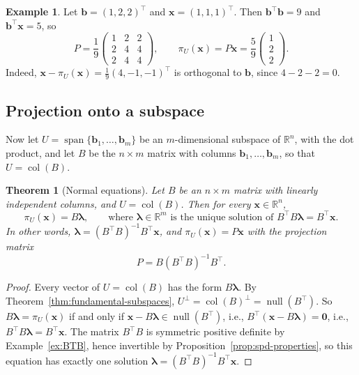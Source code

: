 \documentclass[11pt]{article}
\theoremstyle{definition}
\newtheorem{example}[definition]{Example}
\theoremstyle{plain}
\newtheorem{theorem}[definition]{Theorem}
\theoremstyle{remark}
\DeclareMathOperator{\Null}{null}
\DeclareMathOperator{\col}{col}
\DeclareMathOperator{\Span}{span}
\begin{document}
\begin{example}
    Let $\mathbf{b} = (1, 2, 2)^\top$ and $\mathbf{x} = (1, 1, 1)^\top$. Then $\mathbf{b}^\top \mathbf{b} = 9$ and $\mathbf{b}^\top \mathbf{x} = 5$, so
    \[P = \frac{1}{9} \begin{pmatrix} 1 & 2 & 2 \\ 2 & 4 & 4 \\ 2 & 4 & 4 \end{pmatrix}, \qquad \pi_U(\mathbf{x}) = P\mathbf{x} = \frac{5}{9} \begin{pmatrix} 1 \\ 2 \\ 2 \end{pmatrix}.\]
    Indeed, $\mathbf{x} - \pi_U(\mathbf{x}) = \frac{1}{9}(4, -1, -1)^\top$ is orthogonal to $\mathbf{b}$, since $4 - 2 - 2 = 0$.
\end{example}

\subsection{Projection onto a subspace}

Now let $U = \Span\{\mathbf{b}_1, \ldots, \mathbf{b}_m\}$ be an $m$-dimensional subspace of $\mathbb{R}^n$, with the dot product, and let $B$ be the $n \times m$ matrix with columns $\mathbf{b}_1, \ldots, \mathbf{b}_m$, so that $U = \col(B)$.

\begin{theorem}[Normal equations]\label{thm:projection-subspace}
    Let $B$ be an $n \times m$ matrix with linearly independent columns, and $U = \col(B)$. Then for every $\mathbf{x} \in \mathbb{R}^n$,
    \[\pi_U(\mathbf{x}) = B\boldsymbol{\lambda}, \qquad \text{where } \boldsymbol{\lambda} \in \mathbb{R}^m \text{ is the unique solution of } B^\top B \boldsymbol{\lambda} = B^\top \mathbf{x}.\]
    In other words, $\boldsymbol{\lambda} = (B^\top B)^{-1} B^\top \mathbf{x}$, and $\pi_U(\mathbf{x}) = P\mathbf{x}$ with the projection matrix
    \[P = B (B^\top B)^{-1} B^\top.\]
\end{theorem}

\begin{proof}
    Every vector of $U = \col(B)$ has the form $B\boldsymbol{\lambda}$. By Theorem~\ref{thm:fundamental-subspaces}, $U^\perp = \col(B)^\perp = \Null(B^\top)$. So $B\boldsymbol{\lambda} = \pi_U(\mathbf{x})$ if and only if $\mathbf{x} - B\boldsymbol{\lambda} \in \Null(B^\top)$, i.e., $B^\top(\mathbf{x} - B\boldsymbol{\lambda}) = \mathbf{0}$, i.e., $B^\top B \boldsymbol{\lambda} = B^\top \mathbf{x}$. The matrix $B^\top B$ is symmetric positive definite by Example~\ref{ex:BTB}, hence invertible by Proposition~\ref{prop:spd-properties}, so this equation has exactly one solution $\boldsymbol{\lambda} = (B^\top B)^{-1} B^\top \mathbf{x}$.
\end{proof}
\end{document}
